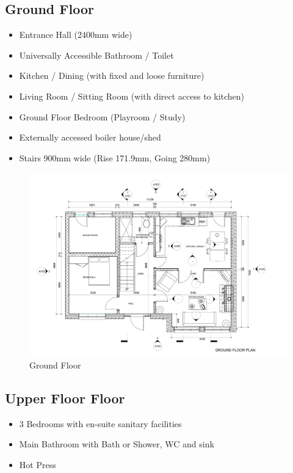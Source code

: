 \subsection{Ground Floor}
\begin{itemize}
	\item Entrance Hall (2400mm wide)
	\item Universally Accessible Bathroom / Toilet
	\item Kitchen / Dining (with fixed and loose furniture)
	\item Living Room / Sitting Room (with direct access to kitchen)
	\item Ground Floor Bedroom (Playroom / Study)
	\item Externally accessed boiler house/shed
	\item Stairs 900mm wide (Rise 171.9mm, Going 280mm)
\end{itemize}



\begin{figure}
	\centering
	\includegraphics[width=1.0\linewidth]{./img/P01GroundFloorLevel.jpg}
	\caption{Ground Floor}
	\label{fig:p01groundfloorlevel}
\end{figure}


\newpage
\subsection{Upper Floor Floor}
\begin{itemize}
	\item 3 Bedrooms with en-suite sanitary facilities
	\item Main Bathroom with Bath or Shower, WC and sink
	\item Hot Press
\end{itemize}



